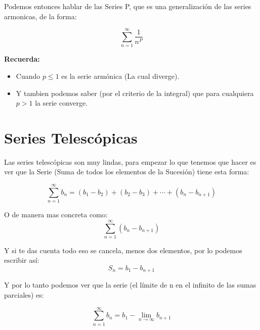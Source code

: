 \documentclass[12pt]{report}							    %
\begin{document}
        Podemos entonces hablar de las Series P, que es una generalización de las series
        armonicas, de la forma:

        \begin{equation}
            \sum_{n=1}^{\infty} \frac{1}{n^P}
        \end{equation}

        \textbf{Recuerda:}
        \begin{itemize}
            \item Cuando $p\leq1$ es la serie armónica (La cual diverge).
            \item Y tambien podemos saber (por el criterio de la integral) que para
            cualquiera $p > 1$ la serie converge.
        \end{itemize}


    \clearpage
    \section{Series Telescópicas}

        Las series telescópicas son muy lindas, para empezar lo que tenemos que
        hacer es ver que la Serie (Suma de todos los elementos de la Sucesión)
        tiene esta forma:

        \begin{equation}
            \sum_{n=1}^{\infty} b_n = (b_1-b_2) + (b_2-b_3) +  \cdots + (b_n-b_{n+1})
        \end{equation}

        O de manera mas concreta como:
        \begin{equation}
            \sum_{n=1}^{\infty} (b_{n} - b_{n+1})
        \end{equation}

        Y si te das cuenta todo eso se cancela, menos dos elementos, por lo podemos
        escribir así:
        \begin{equation}
            S_n = b_1 - b_{n+1}
        \end{equation}

        Y por lo tanto podemos ver que la serie (el límite de n en el
        infinito de las sumas parciales) es:

        \begin{equation}
            \sum_{n=1}^{\infty} b_n =  b_1 - \lim_{n \to \infty} b_{n+1}
        \end{equation}
\end{document}
